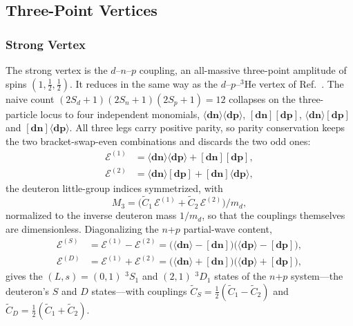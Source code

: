 \documentclass[
  aps,prd,twocolumn,nofootinbib,superscriptaddress,
  longbibliography,floatfix,preprintnumbers
]{revtex4-2}
\newcommand{\ad}[2]{\langle #1 #2\rangle}
\newcommand{\sq}[2]{[#1 #2]}
\newcommand{\CSv}{\tilde{C}_{S}}
\newcommand{\CDv}{\tilde{C}_{D}}
\newcommand{\Cone}{\tilde{C}_{1}}
\newcommand{\Ctwo}{\tilde{C}_{2}}
\begin{document}
\subsection{Three-Point Vertices}
\label{sec:vertices}

\subsubsection{Strong Vertex} 
\label{sec:strongvertex}

The strong vertex is the $d$--$n$--$p$ coupling, an
all-massive three-point amplitude of spins $(1,\tfrac12,\tfrac12)$. It reduces
in the same way as the $d$--$p$--${}^3\mathrm{He}$ vertex of Ref.~\cite{Tait:2026guk}.
The naive count $(2S_{d}{+}1)(2S_{n}{+}1)(2S_{p}{+}1)=12$ collapses on the
three-particle locus to four independent monomials,
$\ad{\bm{d}}{\bm{n}}\ad{\bm{d}}{\bm{p}}$, $\sq{\bm{d}}{\bm{n}}\sq{\bm{d}}{\bm{p}}$,
$\ad{\bm{d}}{\bm{n}}\sq{\bm{d}}{\bm{p}}$ and $\sq{\bm{d}}{\bm{n}}\ad{\bm{d}}{\bm{p}}$.
All three legs carry positive parity, so parity conservation keeps the two
bracket-swap-even combinations and discards the two odd ones:
\begin{equation}
\begin{split}
  \mathcal{E}^{(1)} &= \ad{\bm{d}}{\bm{n}}\ad{\bm{d}}{\bm{p}} + \sq{\bm{d}}{\bm{n}}\sq{\bm{d}}{\bm{p}},\\
  \mathcal{E}^{(2)} &= \ad{\bm{d}}{\bm{n}}\sq{\bm{d}}{\bm{p}} + \sq{\bm{d}}{\bm{n}}\ad{\bm{d}}{\bm{p}},
\end{split}
\end{equation}
the deuteron little-group indices symmetrized, with
\begin{equation}
  M_3=\big(\Cone\,\mathcal{E}^{(1)}+\Ctwo\,\mathcal{E}^{(2)}\big)/m_{d},
  \label{eq:strongbasis}
\end{equation}
normalized to the inverse deuteron mass $1/m_{d}$, so that the couplings themselves are dimensionless. Diagonalizing the
$n$+$p$ partial-wave content,
\begin{equation}
\begin{aligned}
  \mathcal{E}^{(S)} &= \mathcal{E}^{(1)}{-}\mathcal{E}^{(2)}
    = \big(\ad{\bm{d}}{\bm{n}}{-}\sq{\bm{d}}{\bm{n}}\big)
      \big(\ad{\bm{d}}{\bm{p}}{-}\sq{\bm{d}}{\bm{p}}\big),\\
  \mathcal{E}^{(D)} &= \mathcal{E}^{(1)}{+}\mathcal{E}^{(2)}
    = \big(\ad{\bm{d}}{\bm{n}}{+}\sq{\bm{d}}{\bm{n}}\big)
      \big(\ad{\bm{d}}{\bm{p}}{+}\sq{\bm{d}}{\bm{p}}\big),
\end{aligned}
  \label{eq:strongSD}
\end{equation}
gives the $(L,s)=(0,1)$ ${}^{3}S_{1}$ and $(2,1)$ ${}^{3}D_{1}$ states of the
$n$+$p$ system---the deuteron's $S$ and $D$ states---with couplings
$\CSv=\tfrac12(\Cone-\Ctwo)$ and $\CDv=\tfrac12(\Cone+\Ctwo)$.
\end{document}
